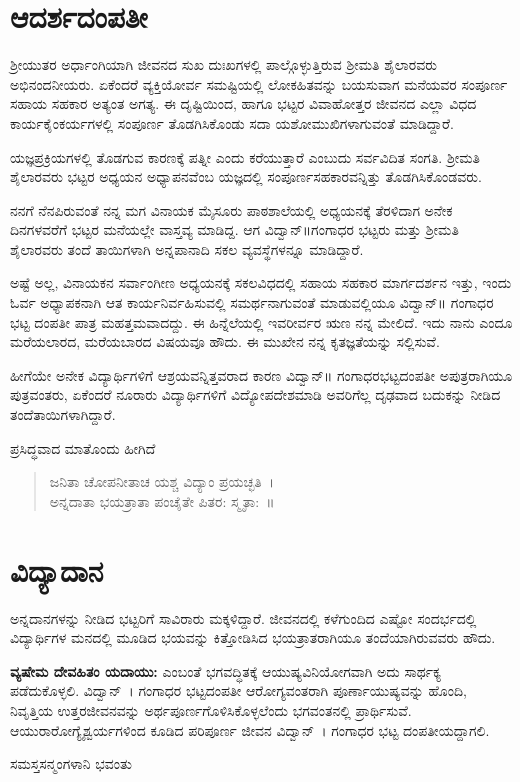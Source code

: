 {\section*{ಆದರ್ಶದಂಪತೀ}

ಶ್ರೀಯುತರ ಅರ್ಧಾಂಗಿಯಾಗಿ ಜೀವನದ ಸುಖ  \enginline{-}  ದುಃಖಗಳಲ್ಲಿ ಪಾಲ್ಗೊಳ್ಳುತ್ತಿರುವ ಶ್ರೀಮತಿ ಶೈಲಾರವರು ಅಭಿನಂದನೀಯರು. ಏಕೆಂದರೆ ವ್ಯಕ್ತಿಯೋರ್ವ ಸಮಷ್ಟಿಯಲ್ಲಿ ಲೋಕಹಿತವನ್ನು ಬಯಸುವಾಗ ಮನೆಯವರ ಸಂಪೂರ್ಣ ಸಹಾಯ  \enginline{-}  ಸಹಕಾರ ಅತ್ಯಂತ ಅಗತ್ಯ. ಈ ದೃಷ್ಟಿಯಿಂದ, ಹಾಗೂ ಭಟ್ಟರ ವಿವಾಹೋತ್ತರ ಜೀವನದ ಎಲ್ಲಾ ವಿಧದ ಕಾರ್ಯಕೈಂಕರ್ಯಗಳಲ್ಲಿ ಸಂಪೂರ್ಣ ತೊಡಗಿಸಿಕೊಂಡು ಸದಾ ಯಶೋಮುಖಿಗಳಾಗುವಂತೆ ಮಾಡಿದ್ದಾರೆ. 

ಯಜ್ಞಪ್ರಕ್ರಿಯಗಳಲ್ಲಿ ತೊಡಗುವ ಕಾರಣಕ್ಕೆ ಪತ್ನೀ ಎಂದು ಕರೆಯುತ್ತಾರೆ ಎಂಬುದು ಸರ್ವವಿದಿತ ಸಂಗತಿ. ಶ್ರೀಮತಿ ಶೈಲಾರವರು ಭಟ್ಟರ ಅಧ್ಯಯನ  \enginline{-}  ಅಧ್ಯಾಪನವೆಂಬ ಯಜ್ಞದಲ್ಲಿ ಸಂಪೂರ್ಣಸಹಕಾರವನ್ನಿತ್ತು ತೊಡಗಿಸಿಕೊಂಡವರು. 									

ನನಗೆ ನೆನಪಿರುವಂತೆ ನನ್ನ ಮಗ ವಿನಾಯಕ ಮೈಸೂರು ಪಾಠಶಾಲೆಯಲ್ಲಿ ಅಧ್ಯಯನಕ್ಕೆ ತೆರಳಿದಾಗ ಅನೇಕ ದಿನಗಳವರೆಗೆ ಭಟ್ಟರ ಮನೆಯಲ್ಲೇ ವಾಸ್ತವ್ಯ ಮಾಡಿದ್ದ. ಆಗ ವಿದ್ವಾನ್॥ಗಂಗಾಧರ ಭಟ್ಟರು ಮತ್ತು ಶ್ರೀಮತಿ ಶೈಲಾರವರು ತಂದೆ  \enginline{-}  ತಾಯಿಗಳಾಗಿ ಅನ್ನಪಾನಾದಿ ಸಕಲ ವ್ಯವಸ್ಥೆಗಳನ್ನೂ ಮಾಡಿದ್ದಾರೆ. 

ಅಷ್ಟೆ ಅಲ್ಲ, ವಿನಾಯಕನ ಸರ್ವಾಂಗೀಣ ಅಧ್ಯಯನಕ್ಕೆ ಸಕಲವಿಧದಲ್ಲಿ ಸಹಾಯ  \enginline{-}  ಸಹಕಾರ  \enginline{-}  ಮಾರ್ಗ\-ದರ್ಶನ ಇತ್ತು, ಇಂದು ಓರ್ವ ಅಧ್ಯಾಪಕನಾಗಿ ಆತ ಕಾರ್ಯನಿರ್ವಹಿಸುವಲ್ಲಿ ಸಮರ್ಥನಾಗುವಂತೆ ಮಾಡುವಲ್ಲಿಯೂ ವಿದ್ವಾನ್॥ ಗಂಗಾಧರ ಭಟ್ಟ ದಂಪತೀ ಪಾತ್ರ ಮಹತ್ತಮವಾದದ್ದು. ಈ ಹಿನ್ನೆಲೆಯಲ್ಲಿ ಇವರೀರ್ವರ ಋಣ ನನ್ನ ಮೇಲಿದೆ. ಇದು ನಾನು ಎಂದೂ ಮರೆಯಲಾರದ, ಮರೆಯಬಾರದ ವಿಷಯವೂ ಹೌದು. ಈ ಮುಖೇನ ನನ್ನ ಕೃತಜ್ಞತೆಯನ್ನು ಸಲ್ಲಿಸುವೆ. 

ಹೀಗೆಯೇ ಅನೇಕ ವಿದ್ಯಾರ್ಥಿಗಳಿಗೆ ಆಶ್ರಯವನ್ನಿತ್ತವರಾದ ಕಾರಣ ವಿದ್ವಾನ್॥ ಗಂಗಾಧರಭಟ್ಟದಂಪತೀ ಅಪುತ್ರರಾಗಿಯೂ ಪುತ್ರವಂತರು, ಏಕೆಂದರೆ ನೂರಾರು ವಿದ್ಯಾರ್ಥಿಗಳಿಗೆ ವಿದ್ಯೋಪದೇಶಮಾಡಿ ಅವರಿಗೆಲ್ಲ ದೃಢವಾದ ಬದುಕನ್ನು ನೀಡಿದ ತಂದೆತಾಯಿಗಳಾಗಿದ್ದಾರೆ. 					

ಪ್ರಸಿದ್ಧವಾದ ಮಾತೊಂದು ಹೀಗಿದೆ  \enginline{-}   
\begin{verse}
ಜನಿತಾ ಚೋಪನೀತಾಚ ಯಶ್ಚ ವಿದ್ಯಾಂ ಪ್ರಯಚ್ಛತಿ~।\\
ಅನ್ನದಾತಾ ಭಯತ್ರಾತಾ ಪಂಚೈತೇ ಪಿತರ: ಸ್ಮೃತಾ:~॥ 		
\end{verse}

\section*{ವಿದ್ಯಾದಾನ   \enginline{-}  } 

ಅನ್ನದಾನಗಳನ್ನು ನೀಡಿದ ಭಟ್ಟರಿಗೆ ಸಾವಿರಾರು ಮಕ್ಕಳಿದ್ದಾರೆ. ಜೀವನದಲ್ಲಿ ಕಳೆಗುಂದಿದ ಎಷ್ಟೋ ಸಂದರ್ಭದಲ್ಲಿ ವಿದ್ಯಾರ್ಥಿಗಳ ಮನದಲ್ಲಿ ಮೂಡಿದ ಭಯವನ್ನು ಕಿತ್ತೋಡಿಸಿದ ಭಯತ್ರಾತರಾಗಿಯೂ ತಂದೆಯಾಗಿರುವವರು ಹೌದು.

\textbf{ವ್ಯಷೇಮ ದೇವಹಿತಂ ಯದಾಯು:} ಎಂಬಂತೆ ಭಗವದ್ಧಿತಕ್ಕೆ ಆಯುಷ್ಯವಿನಿಯೋಗವಾಗಿ ಅದು ಸಾರ್ಥಕ್ಯ ಪಡೆದುಕೊಳ್ಳಲಿ. ವಿದ್ವಾನ್~। ಗಂಗಾಧರ ಭಟ್ಟದಂಪತೀ ಆರೋಗ್ಯವಂತರಾಗಿ ಪೂರ್ಣಾಯುಷ್ಯವನ್ನು ಹೊಂದಿ, ನಿವೃತ್ತಿಯ ಉತ್ತರಜೀವನವನ್ನು ಅರ್ಥಪೂರ್ಣಗೊಳಿಸಿಕೊಳ್ಳಲೆಂದು ಭಗವಂತನಲ್ಲಿ ಪ್ರಾರ್ಥಿಸುವೆ. ಆಯುರಾರೋಗ್ಯೈಶ್ವರ್ಯಗಳಿಂದ ಕೂಡಿದ ಪರಿಪೂರ್ಣ ಜೀವನ ವಿದ್ವಾನ್~। ಗಂಗಾಧರ ಭಟ್ಟ ದಂಪತೀಯದ್ದಾಗಲಿ. 

\centerline{ಸಮಸ್ತಸನ್ಮಂಗಳಾನಿ ಭವಂತು}

\articleend
}
